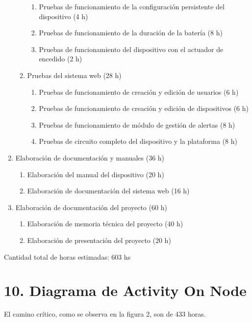 \documentclass[
11pt, %
]{charter}
\begin{document}
\begin{enumerate}
\begin{enumerate}
\begin{enumerate}
	    \item Pruebas de funcionamiento de la configuración persistente del dispositivo (4 h)	
	    \item Pruebas de funcionamiento de la duración de la batería (8 h)
	    \item Pruebas de funcionamiento del dispositivo con el actuador de encedido (2 h)
	    \end{enumerate}
	\item Pruebas del sistema web (28 h)
	    \begin{enumerate}
	    \item Pruebas de funcionamiento de creación y edición de usuarios (6 h)
	    \item Pruebas de funcionamiento de creación y edición de dispositivos (6 h)
	    \item Pruebas de funcionamiento de módulo de gestión de alertas (8 h)
	    \item Pruebas de circuito completo del dispositivo y la plataforma (8 h)
	    \end{enumerate}
	\end{enumerate}
\item Elaboración de documentación y manuales (36 h)
	\begin{enumerate}
	\item Elaboración del manual del dispositivo (20 h)
	\item Elaboración de documentación del sistema web (16 h)
	\end{enumerate}
\item Elaboración de documentación del proyecto (60 h)
	\begin{enumerate}
	\item Elaboración de memoria técnica del proyecto (40 h)
	\item Elaboración de presentación del proyecto (20 h)
	\end{enumerate}
\end{enumerate}

Cantidad total de horas estimadas: 603 hs

\section{10. Diagrama de Activity On Node}
\label{sec:AoN}

El camino crítico, como se observa en la figura 2, son de 433 horas.
\end{document}
